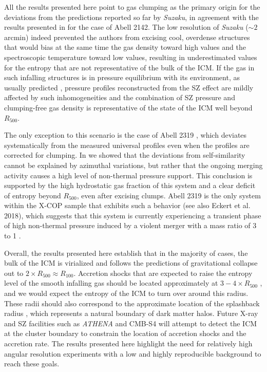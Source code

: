 \documentclass[traditabstract   ]{aa} %
\begin{document}
All the results presented here point to gas clumping as the primary origin for the deviations from the predictions reported so far by \emph{Suzaku}, in agreement with the results presented in \citet{tchernin16} for the case of Abell 2142. The low resolution of \emph{Suzaku} ($\sim2$ arcmin) indeed prevented the authors from excising cool, overdense structures that would bias at the same time the gas density toward high values and the spectroscopic temperature toward low values, resulting in underestimated values for the entropy that are not representative of the bulk of the ICM. If the gas in such infalling structures is in pressure equilibrium with its environment, as usually predicted \citep[e.g.,][]{roncarelli+13,planelles17}, pressure profiles reconstructed from the SZ effect are mildly affected by such inhomogeneities and the combination of SZ pressure and clumping-free gas density is representative of the state of the ICM well beyond $R_{500}$. 

The only exception to this scenario is the case of Abell 2319 \citep{ghirardini18}, which deviates systematically from the measured universal profiles even when the profiles are corrected for clumping. In \citet{ghirardini18} we showed that the deviations from self-similarity cannot be explained by azimuthal variations, but rather that the ongoing merging activity causes a high level of non-thermal pressure support. This conclusion is supported by the high hydrostatic gas fraction of this system and a clear deficit of entropy beyond $R_{500}$, even after excising clumps. Abell 2319 is the only system within the X-COP sample that exhibits such a behavior (see also Eckert et al. 2018), which suggests that this system is currently experiencing a transient phase of high non-thermal pressure induced by a violent merger with a mass ratio of 3 to 1 \citep{oegerle+95}.

Overall, the results presented here establish that in the majority of cases, the bulk of the ICM is virialized and follows the predictions of gravitational collapse out to $2\times R_{500}\approx R_{100}$. Accretion shocks that are expected to raise the entropy level of the smooth infalling gas should be located approximately at $3-4\times R_{500}$ \citep{lau15}, and we would expect the entropy of the ICM to turn over around this radius. These radii should also correspond to the approximate location of the splashback radius \citep{diemer14,diemer17}, which represents a natural boundary of dark matter halos. Future X-ray and SZ facilities such as \emph{ATHENA} \citep{nandra13} and CMB-S4 \citep{cmbs4} will attempt to detect the ICM at the cluster boundary to constrain the location of accretion shocks and the accretion rate. The results presented here highlight the need for relatively high angular resolution experiments with a low and highly reproducible background to reach these goals.
\end{document}
